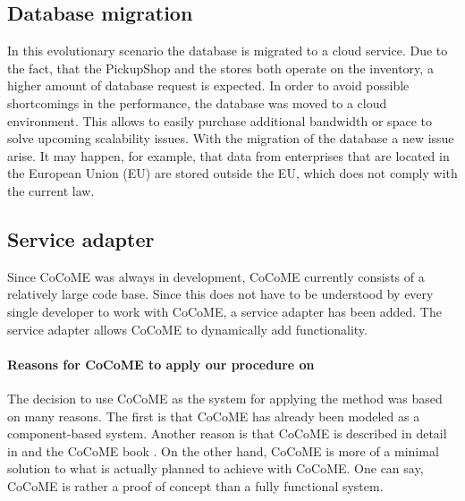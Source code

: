 \subsection{Database migration}
In this evolutionary scenario the database is migrated to a cloud service. Due to the fact, that the PickupShop and the stores both operate on the inventory, a higher amount of database request is expected. In order to avoid possible shortcomings in the performance, the database was moved to a cloud environment. This allows to easily purchase additional bandwidth or space to solve upcoming scalability issues. With the migration of the database a new issue arise. It may happen, for example, that data from enterprises that are located in the European Union (EU) are stored outside the EU, which does not comply with the current law.
\subsection{Service adapter}
Since CoCoME was always in development, CoCoME currently consists of a relatively large code base. Since this does not have to be understood by every single developer to work with CoCoME, a service adapter has been added. The service adapter allows CoCoME to dynamically add functionality.
\paragraph{Reasons for CoCoME to apply our procedure on}
The decision to use CoCoME as the system for applying the method was based on many reasons. The first is that CoCoME has already been modeled as a component-based system. Another reason is that CoCoME is described in detail in \cite{CoCoMETechReport} and the CoCoME book \cite{CoCoMEBook}. 
On the other hand, CoCoME is more of a minimal solution to what is actually planned to achieve with CoCoME. One can say, CoCoME is rather a proof of concept than a fully functional system.
